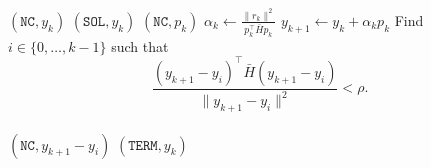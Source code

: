 \begin{algorithm2e}[htbp]
{{         {
            \Return $(\texttt{NC}, y_{k})$
        } {
            \Return $(\texttt{SOL}, y_{k})$
        } {
            \Return $(\texttt{NC}, p_{k})$
        }  {
        $\alpha_{k} \gets \frac{\|r_{k}\|^2}{p_{k}^\top \bar H p_{k}}$\;
        $y_{k+1} \gets y_{k} + \alpha_{k} p_{k}$\;
        Find %
        $i \in \{ 0, \dots, k-1 \}$
        such that 
        \begin{equation}
            \label{eqn:capped-cg-slow-decay-condition}
            \frac{(y_{k+1} - y_i)^\top \bar H (y_{k+1} - y_i)}{\|y_{k+1}-y_i\|^2} < \rho.
        \end{equation} \\
        \Return $(\texttt{NC}, y_{k+1} - y_i)$\;
        }
        { 
            \Return $(\texttt{TERM}, y_k)$ 
        }
    }
    }
\end{algorithm2e}

